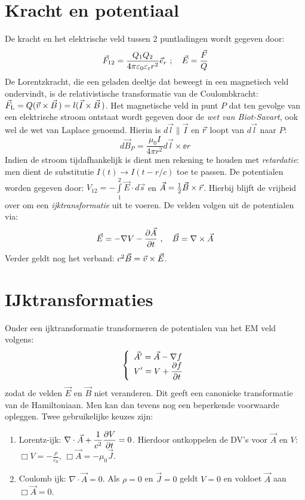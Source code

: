\section{Kracht en potentiaal}
De kracht en het elektrische veld tussen 2 puntladingen wordt gegeven door:
\[
\vec{F}_{12}=\frac{Q_1Q_2}{4\pi\varepsilon_0\varepsilon_{\rm r}r^2}\vec{e}_{r}
~;~~~\vec{E}=\frac{\vec{F}}{Q}
\]
De Lorentzkracht, die een geladen deeltje dat beweegt in een magnetisch veld
ondervindt, is de relativistische transformatie van de Coulombkracht:
$\vec{F}_{\rm L}=Q(\vec{v}\times\vec{B}\,)=l(\vec{I}\times\vec{B}\,)$.
\npar
Het magnetische veld in punt $P$ dat ten gevolge van een elektrische stroom
ontstaat wordt gegeven door de {\it wet van Biot-Savart}, ook wel de wet van
Laplace genoemd. Hierin is $d\vec{l}\parallel\vec{I}$ en $\vec{r}$ loopt van
$d\vec{l}$ naar $P$:
\[
d\vec{B}_P=\frac{\mu_0I}{4\pi r^2}d\vec{l}\times\ee{r}
\]
Indien de stroom tijdafhankelijk is dient men rekening te houden met
{\it retardatie}: men dient de substitutie $I(t)\rightarrow I(t-r/c)$ toe te
passen.
\npar
De potentialen worden gegeven door:
$\displaystyle V_{12}=-\int\limits_1^2\vec{E}\cdot d\vec{s}$ en
$\vec{A}=\mbox{$\frac{1}{2}$}\vec{B}\times\vec{r}$.
\npar
Hierbij blijft de vrijheid over om een {\it ijktransformatie} uit te voeren.
De velden volgen uit de potentialen via:
\[
\vec{E}=-\nabla V-\frac{\partial \vec{A}}{\partial t}~,~~~\vec{B}=\nabla\times\vec{A}
\]
Verder geldt nog het verband: $c^2\vec{B}=\vec{v}\times\vec{E}$.

\section{IJktransformaties}
Onder een ijktransformatie transformeren de potentialen van het EM veld
volgens:
\[
\left\{\begin{array}{l}
\vec{A}'=\vec{A}-\nabla f\\
\displaystyle V'=V+\frac{\partial f}{\partial t}
\end{array}\right.
\]
zodat de velden $\vec{E}$ en $\vec{B}$ niet veranderen. Dit geeft een
canonieke transformatie van de Hamiltoniaan. Men kan dan tevens nog een
beperkende voorwaarde opleggen. Twee gebruikelijke keuzes zijn:
\begin{enumerate}
\item Lorentz-ijk: $\displaystyle\nabla\cdot\vec{A}+\frac{1}{c^2}\frac{\partial V}{\partial t}=0$.
      Hierdoor ontkoppelen de DV's voor $\vec{A}$ en $V$:
      $\displaystyle\Box V=-\frac{\rho}{\varepsilon_0}$, $\Box\vec{A}=-\mu_0\vec{J}$.
\item Coulomb ijk: $\nabla\cdot\vec{A}=0$. Als $\rho=0$ en $\vec{J}=0$ geldt
      $V=0$ en voldoet $\vec{A}$ aan $\Box\vec{A}=0$.
\end{enumerate}

